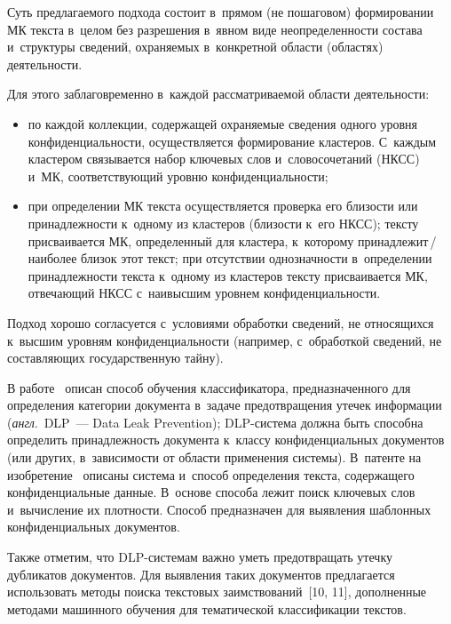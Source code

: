 \begin{multicols}{2}
  Суть предлагаемого подхода состоит в~прямом (не пошаговом) 
формировании МК текста в~целом без разрешения в~явном виде 
неопределенности состава и~структуры сведений, охраняемых в~конкретной 
области (областях) деятельности.
  
  Для этого заблаговременно в~каждой рассматриваемой области 
деятельности:
  \begin{itemize}
  \item  по каждой коллекции, содержащей охра\-ня\-емые сведения одного 
уровня кон\-фи\-ден\-ци\-аль\-ности, осуществляется формирование клас\-те\-ров. 
С~каж\-дым  
клас\-те\-ром связывается \mbox{набор} ключевых слов и~словосочетаний (НКСС) и~МК, соответствующий уровню конфиденциальности;
  \item при определении МК текста осуществляется проверка его бли\-зости 
или принадлежности к~одному из клас\-те\-ров (близости к~его НКСС); текс\-ту 
присваивается МК, определенный для кластера, к~которому  
при\-над\-ле\-жит\,/\,на\-и\-бо\-лее близок этот текст; при отсутствии 
однозначности в~определении принадлежности текс\-та к~одному из клас\-те\-ров 
текс\-ту присваивается МК, отвечающий НКСС с~наивысшим уровнем 
конфиденциальности.
  \end{itemize}
   
  Подход хорошо согласуется с~условиями обработки сведений, не 
относящихся к~высшим уровням конфиденциальности (например, 
с~обработкой сведений, не составляющих государственную тайну).
  
  В работе~\cite{8-bs} описан способ обучения классификатора, 
предназначенного для определения категории документа в~задаче 
предотвращения утечек информации (\textit{англ}.\ DLP~--- Data Leak 
Prevention);\linebreak
 DLP-сис\-те\-ма должна быть способна определить 
принадлежность документа к~классу конфиденциальных документов (или 
других, в~зависимости от об\-ласти применения сис\-те\-мы). В~патенте на 
изоб\-ре\-те\-ние~\cite{9-bs} описаны система и~способ определения текста, 
содержащего конфиденциальные данные. В~основе способа лежит поиск 
ключевых слов и~вычисление их плотности. Способ предназначен для 
выявления шаблонных конфиденциальных документов.
  
  Также отметим, что DLP-системам важно уметь предотвращать утечку 
дубликатов документов. Для выявления таких документов предлагается 
использовать методы поиска текстовых заимствований~[10, 11], дополненные 
методами машинного обучения для тематической классификации текс\-тов.
   

\end{multicols}
